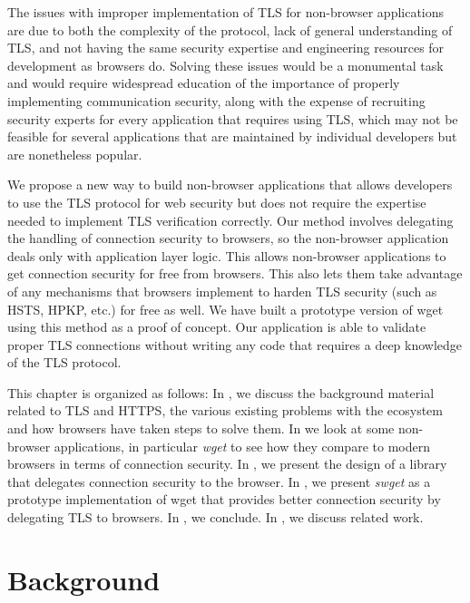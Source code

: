 The issues with improper implementation of TLS for non-browser applications are
due to both the complexity of the protocol, lack of general understanding of
TLS, and not having the same security expertise and engineering resources for
development as browsers do. Solving these issues would be a monumental task and
would require widespread education of the importance of properly implementing
communication security, along with the expense of recruiting security experts
for every application that requires using TLS, which may not be feasible for
several applications that are maintained by individual developers but are
nonetheless popular.

We propose a new way to build non-browser applications that allows developers
to use the TLS protocol for web security but does not require the expertise
needed to implement TLS verification correctly. Our method involves delegating
the handling of connection security to browsers, so the non-browser application
deals only with application layer logic. This allows non-browser applications
to get connection security for free from browsers. This also lets them take
advantage of any mechanisms that browsers implement to harden TLS security
(such as HSTS, HPKP, etc.) for free as well. We have built a prototype version
of wget using this method as a proof of concept. Our application is able to
validate proper TLS connections without writing any code that requires a deep
knowledge of the TLS protocol.

This chapter is organized as follows: In , we
discuss the background material related to TLS and HTTPS, the various existing
problems with the ecosystem and how browsers have taken steps to solve them. In
 we look at some non-browser applications, in
particular \emph{wget} to see how they compare to modern browsers in terms of
connection security. In , we present the design of a
library that delegates connection security to the browser. In
, we present \emph{swget} as a prototype implementation
of wget that provides better connection security by delegating TLS to browsers.
In , we conclude. In , we
discuss related work.


\section{Background}
\label{sec:background-saber}

